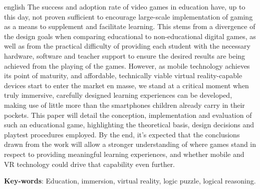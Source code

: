 \begin{resumo}[Abstract]
 \begin{otherlanguage*}{english}
   The success and adoption rate of video games in education have, up to this day, not proven sufficient to encourage large-scale implementation of gaming as a means to supplement and facilitate learning. This stems from a divergence of the design goals when comparing educational to non-educational digital games, as well as from the practical difficulty of providing each student with the necessary hardware, software and teacher support to ensure the desired results are being achieved from the playing of the games. However, as mobile technology achieves its point of maturity, and affordable, technically viable virtual reality-capable devices start to enter the market en masse, we stand at a critical moment when truly immersive, carefully designed learning experiences can be developed, making use of little more than the smartphones children already carry in their pockets. This paper will detail the conception, implementation and evaluation of such an educational game, highlighting the theoretical basis, design decisions and playtest procedures employed. By the end, it’s expected that the conclusions drawn from the work will allow a stronger understanding of where games stand in respect to providing meaningful learning experiences, and whether mobile and VR technology could drive that capability even further.

    \vspace{\onelineskip}

    \noindent
    \textbf{Key-words}: Education, immersion, virtual reality, logic puzzle, logical reasoning.
  \end{otherlanguage*}
\end{resumo}